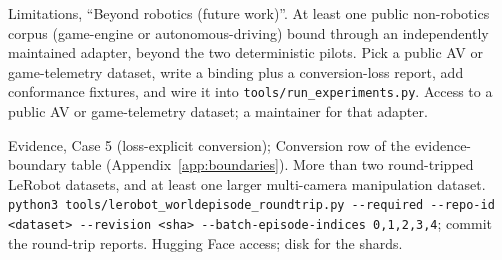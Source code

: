 {Limitations, ``Beyond robotics (future work)''.}
{At least one public non-robotics corpus (game-engine or autonomous-driving) bound through an
independently maintained adapter, beyond the two deterministic pilots.}
{Pick a public AV or game-telemetry dataset, write a binding plus a conversion-loss report, add
conformance fixtures, and wire it into \texttt{tools/run\_experiments.py}.}
{Access to a public AV or game-telemetry dataset; a maintainer for that adapter.}

{Evidence, Case 5 (loss-explicit conversion); Conversion row of the evidence-boundary table
(Appendix~\ref{app:boundaries}).}
{More than two round-tripped LeRobot datasets, and at least one larger multi-camera manipulation
dataset.}
{\texttt{python3 tools/lerobot\_worldepisode\_roundtrip.py -{}-required -{}-repo-id <dataset>
-{}-revision <sha> -{}-batch-episode-indices 0,1,2,3,4}; commit the round-trip reports.}
{Hugging Face access; disk for the shards.}

\fi
